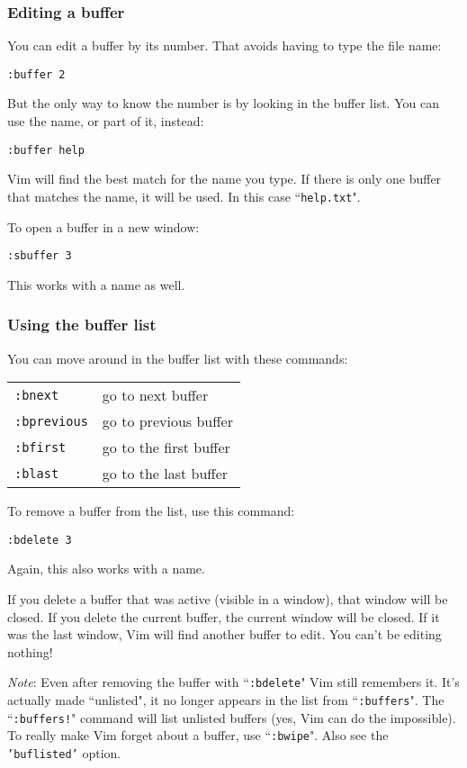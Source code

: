 \subsubsection{Editing a buffer}
You can edit a buffer by its number.
That avoids having to type the file name:
 
\begin{Verbatim}[samepage=true]
 :buffer 2
\end{Verbatim}

But the only way to know the number is by looking in the buffer list.
You can use the name, or part of it, instead:

\begin{Verbatim}[samepage=true]
 :buffer help
\end{Verbatim}

Vim will find the best match for the name you type.
If there is only one buffer that matches the name, it will be used.
In this case ``\texttt{help.txt}".

To open a buffer in a new window:

\begin{Verbatim}[samepage=true]
 :sbuffer 3
\end{Verbatim}

This works with a name as well.
\subsubsection{Using the buffer list}
You can move around in the buffer list with these commands:

\begin{center} \begin{tabular}{l l}
				\texttt{:bnext} & go to next buffer \\
				\texttt{:bprevious} & go to previous buffer \\
				\texttt{:bfirst} & go to the first buffer \\
				\texttt{:blast} & go to the last buffer
\end{tabular} \end{center}
To remove a buffer from the list, use this command:

\begin{Verbatim}[samepage=true]
 :bdelete 3
\end{Verbatim}

Again, this also works with a name.

If you delete a buffer that was active (visible in a window), that window will be closed.
If you delete the current buffer, the current window will be closed.
If it was the last window, Vim will find another buffer to edit.
You can't be editing nothing!

\emph{Note}: Even after removing the buffer with ``\texttt{:bdelete}" Vim still remembers it.
It's actually made ``unlisted", it no longer appears in the list from ``\texttt{:buffers}".
The ``\texttt{:buffers!}" command will list unlisted buffers (yes, Vim can do the impossible).
To really make Vim forget about a buffer, use ``\texttt{:bwipe}".
Also see the \texttt{'buflisted'} option.
\clearpage
